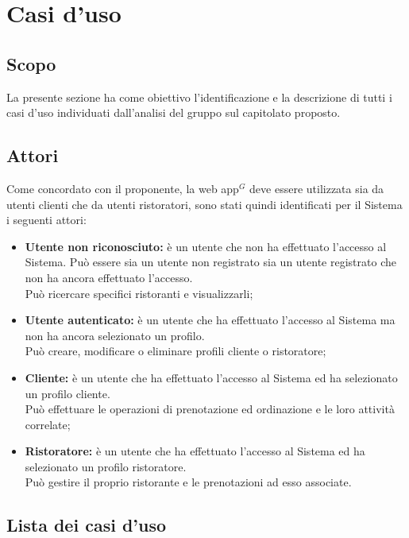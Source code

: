\section{Casi d'uso}
\subsection{Scopo}

La presente sezione ha come obiettivo l'identificazione e la descrizione di tutti i casi d'uso individuati dall'analisi del gruppo sul capitolato proposto.
    
\subsection{Attori}
Come concordato con il proponente, la web app$^{G}$ deve essere utilizzata sia da utenti clienti che da utenti ristoratori, sono stati quindi identificati per il Sistema i seguenti attori:
\begin{itemize}
    \item \textbf{Utente non riconosciuto:} è un utente che non ha effettuato l'accesso al Sistema. Può essere sia un utente non registrato sia un utente registrato che non ha ancora effettuato l'accesso.\\
    Può ricercare specifici ristoranti e visualizzarli;
    \item \textbf{Utente autenticato:} è un utente che ha effettuato l'accesso al Sistema ma non ha ancora selezionato un profilo.\\ 
    Può creare, modificare o eliminare profili cliente o ristoratore;
    \item \textbf{Cliente:} è un utente che ha effettuato l'accesso al Sistema ed ha selezionato un profilo cliente.\\
    Può effettuare le operazioni di prenotazione ed ordinazione e le loro attività correlate;
    \item \textbf{Ristoratore:} è un utente che ha effettuato l'accesso al Sistema ed ha selezionato un profilo ristoratore.\\
    Può gestire il proprio ristorante e le prenotazioni ad esso associate.
\end{itemize}

\pagebreak
\subsection{Lista dei casi d'uso}








